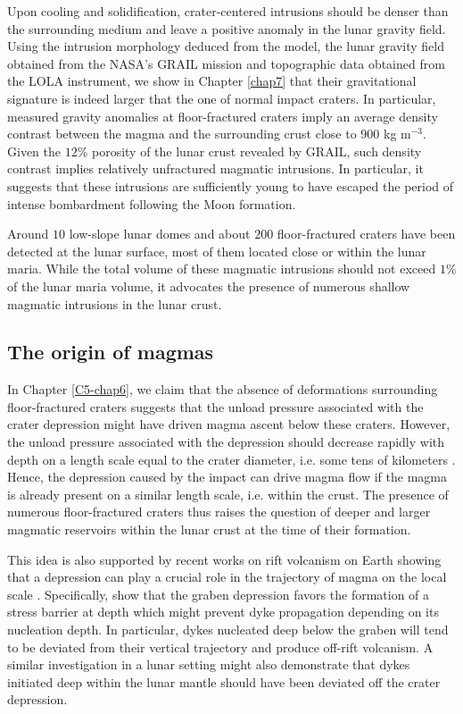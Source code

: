 Upon cooling and solidification,  crater-centered intrusions should be
denser than the surrounding medium and leave a positive anomaly in the
lunar gravity field.  Using the  intrusion morphology deduced from the
model, the lunar gravity field  obtained from the NASA’s GRAIL mission
and topographic  data obtained  from the LOLA  instrument, we  show in
Chapter  \ref{chap7} that  their  gravitational  signature is  indeed
larger that the one of  normal impact craters. In particular, measured
gravity anomalies at floor-fractured  craters imply an average density
contrast between the magma and the surrounding crust close to $900$ kg
m$^{-3}$. Given  the $12\%$  porosity of the  lunar crust  revealed by
GRAIL, such  density contrast implies relatively  unfractured magmatic
intrusions.   In particular,  it  suggests that  these intrusions  are
sufficiently young to  have escaped the period  of intense bombardment
following the Moon formation.

Around  $10$ low-slope  lunar  domes and  about $200$  floor-fractured
craters have been detected at the  lunar surface, most of them located
close  or within  the lunar  maria. While  the total  volume of  these
magmatic intrusions should not exceed $1\%$ of the lunar maria volume,
it advocates the  presence of numerous shallow  magmatic intrusions in
the lunar crust.

\subsection{The origin of magmas}
\label{sec:crust-magm-intr}

In Chapter  \ref{C5-chap6}, we claim  that the absence  of deformations
surrounding floor-fractured craters suggests  that the unload pressure
associated with  the crater depression  might have driven  magma ascent
below these craters. However, the  unload pressure associated with the
depression should decrease rapidly with  depth on a length scale equal
to   the   crater   diameter,    i.e.    some   tens   of   kilometers
\citep{Pinel:2000wa}. Hence,  the depression caused by  the impact can
drive magma flow  if the magma is already present  on a similar length
scale, i.e. within the crust. The presence of numerous floor-fractured
craters  thus  raises  the  question of  deeper  and  larger  magmatic
reservoirs within the lunar crust at the time of their formation.

This idea is also supported by recent works on rift volcanism on Earth
showing that a depression can play a crucial role in the trajectory of
magma  on the  local  scale \citep{Maccaferri:2014ft}.   Specifically,
\citet{Maccaferri:2014ft} show  that the graben depression  favors the
formation  of a  stress  barrier  at depth  which  might prevent  dyke
propagation depending  on its  nucleation depth. In  particular, dykes
nucleated deep  below the graben will  tend to be deviated  from their
vertical  trajectory  and  produce   off-rift  volcanism.   A  similar
investigation in  a lunar  setting might  also demonstrate  that dykes
initiated deep within  the lunar mantle should have  been deviated off
the crater depression. 

